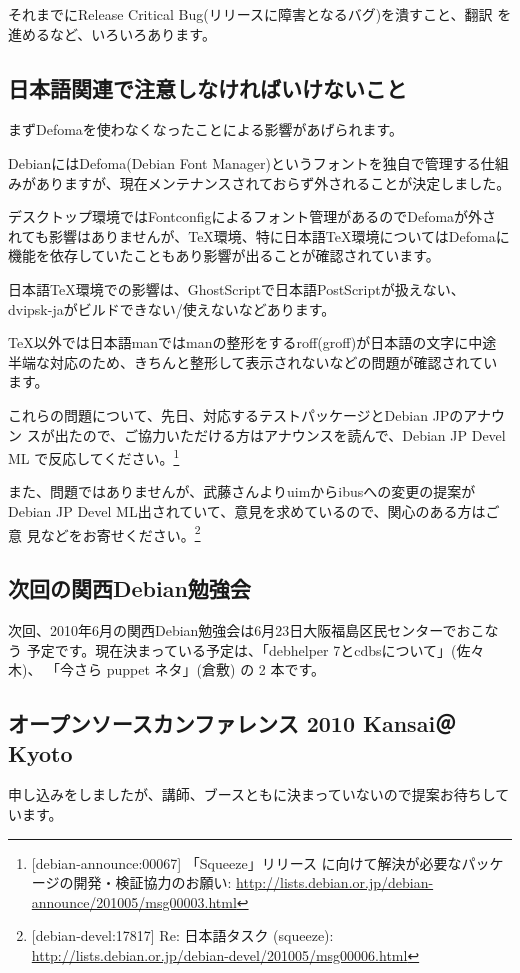 \documentclass[mingoth,a4paper]{jsarticle}
\begin{document}
それまでにRelease Critical Bug(リリースに障害となるバグ)を潰すこと、翻訳
を進めるなど、いろいろあります。

\subsection{日本語関連で注意しなければいけないこと}

まずDefomaを使わなくなったことによる影響があげられます。

DebianにはDefoma(Debian Font Manager)というフォントを独自で管理する仕組
みがありますが、現在メンテナンスされておらず外されることが決定しました。

デスクトップ環境ではFontconfigによるフォント管理があるのでDefomaが外さ
れても影響はありませんが、TeX環境、特に日本語TeX環境についてはDefomaに
機能を依存していたこともあり影響が出ることが確認されています。

日本語TeX環境での影響は、GhostScriptで日本語PostScriptが扱えない、
dvipsk-jaがビルドできない/使えないなどあります。

TeX以外では日本語manではmanの整形をするroff(groff)が日本語の文字に中途
半端な対応のため、きちんと整形して表示されないなどの問題が確認されてい
ます。

これらの問題について、先日、対応するテストパッケージとDebian JPのアナウン
スが出たので、ご協力いただける方はアナウンスを読んで、Debian JP Devel ML
で反応してください。\footnote{[debian-announce:00067] 「Squeeze」リリース
に向けて解決が必要なパッケージの開発・検証協力のお願い:
\url{http://lists.debian.or.jp/debian-announce/201005/msg00003.html}}

また、問題ではありませんが、武藤さんよりuimからibusへの変更の提案が
Debian JP Devel ML出されていて、意見を求めているので、関心のある方はご意
見などをお寄せください。\footnote{[debian-devel:17817] Re: 日本語タスク
(squeeze):
\url{http://lists.debian.or.jp/debian-devel/201005/msg00006.html}}


\subsection{次回の関西Debian勉強会}
次回、2010年6月の関西Debian勉強会は6月23日大阪福島区民センターでおこなう
予定です。現在決まっている予定は、「debhelper 7とcdbsについて」(佐々木)、
「今さら puppet ネタ」(倉敷) の 2 本です。

\subsection{オープンソースカンファレンス 2010 Kansai＠Kyoto}
申し込みをしましたが、講師、ブースともに決まっていないので提案お待ちしています。
\end{document}
